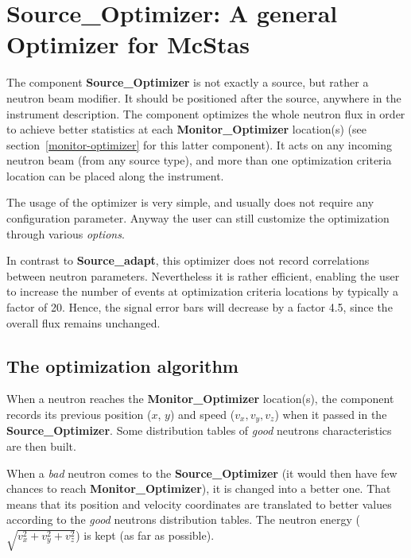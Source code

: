 \section{Source\_Optimizer: A general Optimizer for McStas}
\label{source-optimizer}

The component \textbf{Source\_Optimizer} is not exactly a source,
but rather a neutron beam modifier.
It should be positioned after the source, anywhere in the instrument description.
The component  optimizes the whole neutron flux
in order to achieve better statistics at each \textbf{Monitor\_Optimizer}
location(s) (see section~\ref{monitor-optimizer} for this latter
component). It acts on any incoming neutron beam (from any source
type), and more than one optimization criteria location can be placed
along the instrument.

The usage of the optimizer is very simple, and usually does not require
any configuration parameter. Anyway the user can still customize the
optimization through various \textit{options}.

In contrast to \textbf{Source\_adapt}, this optimizer does not
record correlations between neutron parameters.
Nevertheless it is rather efficient,
enabling the user to increase the number of events
at optimization criteria locations by typically a factor of 20.
Hence, the signal error bars will decrease by a factor 4.5,
since the overall flux remains unchanged.

\subsection{The optimization algorithm}

When a neutron reaches the \textbf{Monitor\_Optimizer} location(s), the
component records its previous position ($x$, $y$) and speed ($v_x,
v_y, v_z$) when it passed in the \textbf{Source\_Optimizer}. Some
distribution tables of \textit{good} neutrons characteristics are then
built.

When a \textit{bad} neutron comes to the \textbf{Source\_Optimizer} (it would
then have few chances to reach \textbf{Monitor\_Optimizer}), it is changed
into a better one. That means that its position and velocity coordinates
are translated to better values according to the \textit{good} neutrons
distribution tables. The neutron energy
($\sqrt{v_x^2 + v_y^2 + v_z^2}$) is kept (as far as possible).

